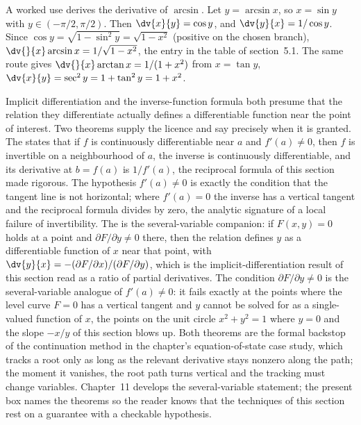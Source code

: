 A worked use derives the derivative of $\arcsin$. Let $y =
\arcsin x$, so $x = \sin y$ with $y \in (-\pi/2, \pi/2)$. Then
$\dv{x}{y} = \cos y$, and $\dv{y}{x} = 1/\cos y$. Since $\cos y =
\sqrt{1 - \sin^{2} y} = \sqrt{1 - x^{2}}$ (positive on the chosen
branch), $\dv{}{x} \arcsin x = 1/\sqrt{1 - x^{2}}$, the entry in
the table of section~5.1. The same route gives $\dv{}{x} \arctan x
= 1/(1 + x^{2})$ from $x = \tan y$, $\dv{x}{y} = \sec^{2} y = 1 +
\tan^{2} y = 1 + x^{2}$.

\begin{mastery}
Implicit differentiation and the inverse-function formula both presume
that the relation they differentiate actually defines a differentiable
function near the point of interest. Two theorems supply the licence and
say precisely when it is granted. The  states that if $f$ is continuously differentiable near $a$ and
$f'(a) \neq 0$, then $f$ is invertible on a neighbourhood of $a$, the
inverse is continuously differentiable, and its derivative at $b = f(a)$
is $1/f'(a)$, the reciprocal formula of this section made rigorous. The
hypothesis $f'(a) \neq 0$ is exactly the condition that the tangent line
is not horizontal; where $f'(a) = 0$ the inverse has a vertical tangent
and the reciprocal formula divides by zero, the analytic signature of a
local failure of invertibility. The 
is the several-variable companion: if $F(x, y) = 0$ holds at a point and
$\partial F/\partial y \neq 0$ there, then the relation defines $y$ as a
differentiable function of $x$ near that point, with
$\dv{y}{x} = -(\partial F/\partial x)/(\partial F/\partial y)$, which is
the implicit-differentiation result of this section read as a ratio of
partial derivatives. The condition $\partial F/\partial y \neq 0$ is the
several-variable analogue of $f'(a) \neq 0$: it fails exactly at the
points where the level curve $F = 0$ has a vertical tangent and $y$
cannot be solved for as a single-valued function of $x$, the points on
the unit circle $x^{2} + y^{2} = 1$ where $y = 0$ and the slope $-x/y$
of this section blows up. Both theorems are the formal backstop of the
continuation method in the chapter's equation-of-state case study, which
tracks a root only as long as the relevant derivative stays nonzero
along the path; the moment it vanishes, the root path turns vertical and
the tracking must change variables. Chapter~11 develops the
several-variable statement; the present box names the theorems so the
reader knows that the techniques of this section rest on a guarantee with
a checkable hypothesis.
\end{mastery}

